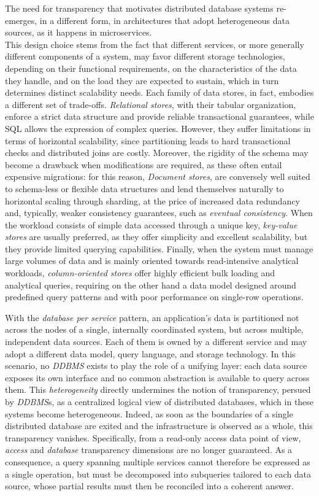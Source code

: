 The need for transparency that motivates distributed database systems
re-emerges, in a different form, in architectures that adopt heterogeneous
data sources, as it happens in microservices. \\
This design choice stems from the fact that different services, or more
generally different components of a system, may favor different storage
technologies, depending on their functional requirements, on the
characteristics of the data they handle, and on the load they are expected to
sustain, which in turn determines distinct scalability needs. Each family of
data stores, in fact, embodies a different set of trade-offs.
\textit{Relational stores}, with their tabular organization, enforce a strict
data structure and provide reliable transactional guarantees, while SQL allows
the expression of complex queries. However, they suffer limitations in terms of
horizontal scalability, since partitioning leads to hard transactional checks
and distributed joins are costly. Moreover, the rigidity of the schema may
become a drawback when modifications are required, as these often entail
expensive migrations: for this reason, \textit{Document stores}, are conversely
well suited to schema-less or flexible data structures and lend themselves
naturally to horizontal scaling through sharding, at the price of increased data
redundancy and, typically, weaker consistency guarantees, such as \textit{eventual
consistency}. When the workload consists of simple data accessed through a
unique key, \textit{key-value stores} are usually preferred, as they offer
simplicity and excellent scalability, but they provide limited querying
capabilities. Finally, when the system must manage large volumes of data and is
mainly oriented towards read-intensive analytical workloads,
\textit{column-oriented stores} offer highly efficient bulk loading and
analytical queries, requiring on the other hand a data model designed 
around predefined query patterns and with poor performance on single-row
operations. 

With the \textit{database per service} pattern, an application's data is
partitioned not across the nodes of a single, internally coordinated system, but
across multiple, independent data sources. Each of them is owned by a different
service and may adopt a different data model, query language, and storage
technology. In this scenario, no \textit{DDBMS} exists to play the role of a
unifying layer: each data source exposes its own interface and no common
abstraction is available to query across them. This \textit{heterogeneity}
directly undermines the notion of transparency, persued by \textit{DDBMS}s, as a
centralized logical view of distributed databases, which in these systems become
heterogeneous. Indeed, as soon as the boundaries of a single distributed
database are exited and the infrastructure is observed as a whole, this
transparency vanishes. Specifically, from a read-only access data point of view,
\textit{access} and \textit{database} transparency dimensions are no longer
guaranteed. As a consequence, a query spanning multiple services cannot
therefore be expressed as a single operation, but must be decomposed into
subqueries tailored to each data source, whose partial results must then be
reconciled into a coherent answer. 

